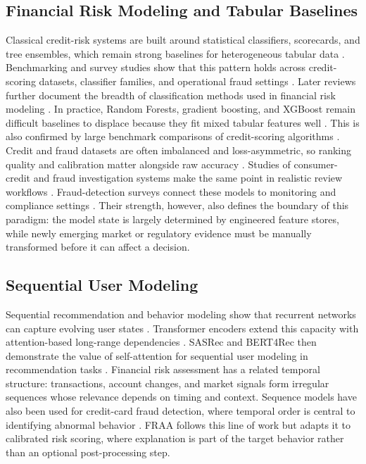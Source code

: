 \documentclass[runningheads]{llncs}
\begin{document}
\subsection{Financial Risk Modeling and Tabular Baselines}
Classical credit-risk systems are built around statistical classifiers, scorecards, and tree ensembles, which remain strong baselines for heterogeneous tabular data \cite{hand1997statistical,thomas2000survey}. Benchmarking and survey studies show that this pattern holds across credit-scoring datasets, classifier families, and operational fraud settings \cite{baesens2003benchmarking,abdou2011credit}. Later reviews further document the breadth of classification methods used in financial risk modeling \cite{louzada2016classification}. In practice, Random Forests, gradient boosting, and XGBoost remain difficult baselines to displace because they fit mixed tabular features well \cite{breiman2001random,friedman2001greedy}. This is also confirmed by large benchmark comparisons of credit-scoring algorithms \cite{chen2016xgboost,lessmann2015benchmarking}. Credit and fraud datasets are often imbalanced and loss-asymmetric, so ranking quality and calibration matter alongside raw accuracy \cite{crook2007recent,brown2012experimental}. Studies of consumer-credit and fraud investigation systems make the same point in realistic review workflows \cite{khandani2010consumer,bellotti2009support}. Fraud-detection surveys connect these models to monitoring and compliance settings \cite{bolton2002statistical,ngai2011application}. Their strength, however, also defines the boundary of this paradigm: the model state is largely determined by engineered feature stores, while newly emerging market or regulatory evidence must be manually transformed before it can affect a decision.

\subsection{Sequential User Modeling}
Sequential recommendation and behavior modeling show that recurrent networks can capture evolving user states \cite{hochreiter1997lstm,cho2014learning}. Transformer encoders extend this capacity with attention-based long-range dependencies \cite{vaswani2017attention}. SASRec and BERT4Rec then demonstrate the value of self-attention for sequential user modeling in recommendation tasks \cite{kang2018sasrec,sun2019bert4rec}. Financial risk assessment has a related temporal structure: transactions, account changes, and market signals form irregular sequences whose relevance depends on timing and context. Sequence models have also been used for credit-card fraud detection, where temporal order is central to identifying abnormal behavior \cite{jurgovsky2018sequence}. FRAA follows this line of work but adapts it to calibrated risk scoring, where explanation is part of the target behavior rather than an optional post-processing step.
\end{document}
